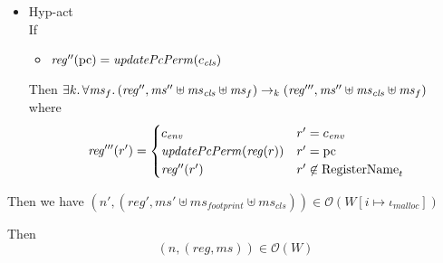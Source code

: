 \documentclass[a4paper]{article}
\newcommand{\var}[1]{\mathit{#1}}
\newcommand{\hs}{\var{ms}}
\newcommand{\ms}{\hs}
\newcommand{\pcreg}{\mathrm{pc}}
\newcommand{\reg}{\var{reg}}
\newcommand{\env}{\var{env}}
\newcommand{\cls}{\var{cls}}
\newcommand{\plainfun}[2]{
  \ifthenelse{\equal{#2}{}}
  {\mathit{#1}}
  {\mathit{#1}(#2)}
}
\newcommand{\updatePcPerm}[1]{\plainfun{updatePcPerm}{#1}}
\newcommand{\codelabel}[1]{\mathit{#1}}
\newcommand{\malloc}{\codelabel{malloc}}
\newcommand{\plaindom}[1]{\mathrm{#1}}
\newcommand{\RegName}{\plaindom{RegisterName}}
\newcommand{\observations}{\mathcal{O}}
\newcommand{\npair}[2][n]{\left(#1,#2 \right)}
\newcommand{\step}[1][]{\rightarrow_{#1}}
\begin{document}
\begin{lemma}
\begin{itemize}
\begin{itemize}
    \item Hyp-act\\ If
      \begin{itemize}
      \item $\reg''(\pcreg) = \updatePcPerm{c_\cls}$
      \end{itemize}
      Then  $\exists k \ldotp \forall \ms_f \ldotp (\reg'',\ms'' \uplus \ms_\cls \uplus \ms_f) \step[k] (\reg''',\ms'' \uplus \ms_\cls \uplus \ms_f)$
      where
        \begin{equation*}
          \reg'''(r') =
          \begin{cases}
            c_\env & r' = c_\env \\
            \updatePcPerm{\reg(r)} & r' = \pcreg \\
            \reg''(r') & r' \not\in \RegName_t
          \end{cases}
        \end{equation*}
    \end{itemize}
    Then we have $\npair[n']{(\reg',\ms' \uplus \ms_{\var{footprint}} \uplus \ms_\cls)} \in \observations(W[i \mapsto \iota_\malloc])$
  \end{itemize}
  Then 
  \[
    \npair{(\reg,\ms)} \in \observations(W)
  \]
\end{lemma}
\end{document}
